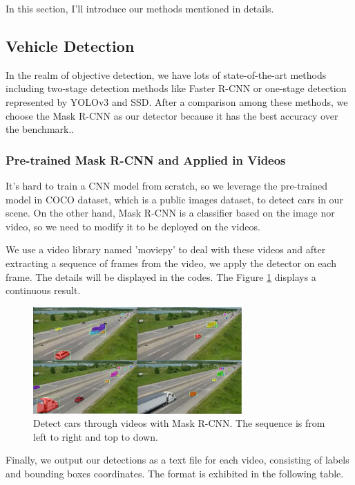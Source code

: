 \documentclass[10pt,twocolumn,letterpaper]{article}
\begin{document}
In this section, I'll introduce our methods mentioned in details.

\subsection{Vehicle Detection}

In the realm of objective detection, we have lots of state-of-the-art methods including two-stage detection methods like Faster R-CNN \cite{ren2015faster} or one-stage detection represented by YOLOv3\cite{redmon2018yolov3}
and SSD\cite{liu2016ssd}. After a comparison among these methods, we choose the Mask R-CNN as our detector because it has the best accuracy over the benchmark.\cite{DBLP:journals/corr/HeGDG17}.
	
\subsubsection{Pre-trained Mask R-CNN and Applied in Videos}

It's hard to train a CNN model from scratch, so we leverage the pre-trained model in COCO dataset\cite{DBLP:journals/corr/LinMBHPRDZ14}, which is a public images dataset, to detect cars in our scene. On the other hand, Mask R-CNN is a classifier based on the image nor video, so we need to modify it to be deployed on the videos. 
	
	We use a video library named 'moviepy' to deal with these videos and after extracting a sequence of frames from the video, we apply the detector on each frame. The details will be displayed in the codes. The Figure \ref{seq_cars} displays a continuous result. 
	
	\begin{figure}  
    \includegraphics[width=8cm]{images/car.png}
    \caption{Detect cars through videos with Mask R-CNN. The sequence is from left to right and top to down.}
    \label{seq_cars}
	\end{figure}

	
	Finally, we output our detections as a text file for each video, consisting of labels and bounding boxes coordinates. The format is exhibited in the following table. 
	
\end{document}
